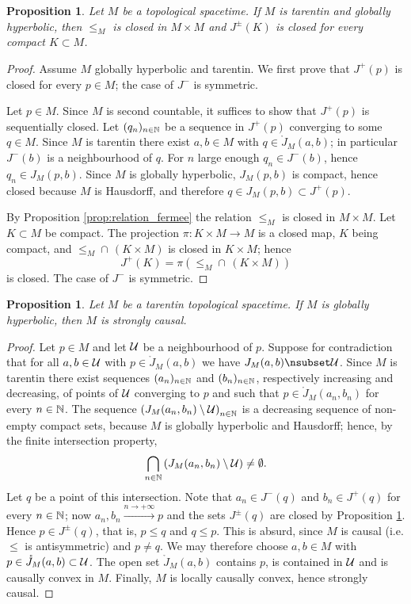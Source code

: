 \documentclass[a4paper,twoside]{article}
\newtheorem{prop}[lem]{Proposition}
\begin{document}
\begin{prop} \label{prop:GH_Jferme}Let $M$ be a topological spacetime. If $M$ is
tarentin and globally hyperbolic, then $\leq_M$ is closed in $M\times M$ and $J^\pm(K)$ is closed
for every compact $K\subset M$.
\end{prop}
\begin{proof}
Assume $M$ globally hyperbolic and tarentin.
We first prove that $J^+(p)$ is closed for every $p\in M$; the case of $J^-$ is symmetric.

Let $p\in M$. Since $M$ is second countable, it suffices to show that $J^+(p)$ is sequentially closed.
Let $(q_n)_{n\in \mathbb{N}}$ be a sequence in $J^+(p)$ converging to some $q\in M$. Since $M$ is tarentin
there exist $a,b\in M$ with $q\in \ring J_M(a,b)$; in particular $J^-(b)$ is a neighbourhood of $q$.
For $n$ large enough $q_n\in J^-(b)$, hence $q_n \in J_M(p,b)$. Since $M$ is globally hyperbolic,
$J_M(p,b)$ is compact, hence closed because $M$ is Hausdorff, and therefore $q\in J_M(p,b)\subset J^+(p)$.

By Proposition \ref{prop:relation_fermee} the relation $\leq_M$ is closed in $M\times M$.
Let $K\subset M$ be compact. The projection $\pi:K\times M\rightarrow M$ is a closed map, $K$ being
compact, and $\leq_M\cap\,(K\times M)$ is closed in $K\times M$; hence
$$J^+(K)=\pi\left(\leq_M\cap\,(K\times M)\right)$$
is closed. The case of $J^-$ is symmetric.
\end{proof}

\begin{prop} \label{prop:GH_fortement_causal}Let $M$ be a tarentin topological spacetime.
If $M$ is globally hyperbolic, then $M$ is strongly causal.
\end{prop}
\begin{proof}
Let $p\in M$ and let $\mathcal{U}$ be a neighbourhood of $p$.
Suppose for contradiction that for all $a,b \in \mathcal{U}$ with $p\in \ring{J}_M(a,b)$ we have $J_M(a,b) \nsubset \U$.
Since $M$ is tarentin there exist sequences $(a_n)_{n\in \mathbb{N}}$ and $(b_n)_{n\in \mathbb{N}}$, respectively increasing and decreasing,
of points of $\mathcal{U}$ converging to $p$ and such that $p\in \ring J_M(a_n,b_n)$ for every $n\in \mathbb{N}$.
The sequence $\left(J_M(a_n,b_n)\setminus \mathcal{U} \right)_{n\in \mathbb{N}}$
is a decreasing sequence of non-empty compact sets, because $M$ is globally hyperbolic and Hausdorff; hence, by the finite intersection property,
$$\bigcap_{n\in \mathbb{N}}\left(J_M(a_n,b_n)\setminus \mathcal{U} \right) \neq \emptyset.$$
Let $q$ be a point of this intersection.
Note that $a_n \in J^-(q)$ and $b_n \in J^+(q)$ for every $n\in \mathbb{N}$; now $a_n,b_n\xrightarrow{n\rightarrow +\infty} p$
and the sets $J^\pm(q)$ are closed by Proposition \ref{prop:GH_Jferme}. Hence $p\in J^\pm(q)$, that is, $p\leq q$ and $q\leq p$.
This is absurd, since $M$ is causal (i.e. $\leq$ is antisymmetric) and $p\neq q$.
We may therefore choose $a,b\in M$ with $p\in \ring J_M(a,b) \subset \U$. The open set
$\ring J_M(a,b)$ contains $p$, is contained in $\mathcal{U}$ and is causally convex in $M$.
Finally, $M$ is locally causally convex, hence strongly causal.
\end{proof}
\end{document}
